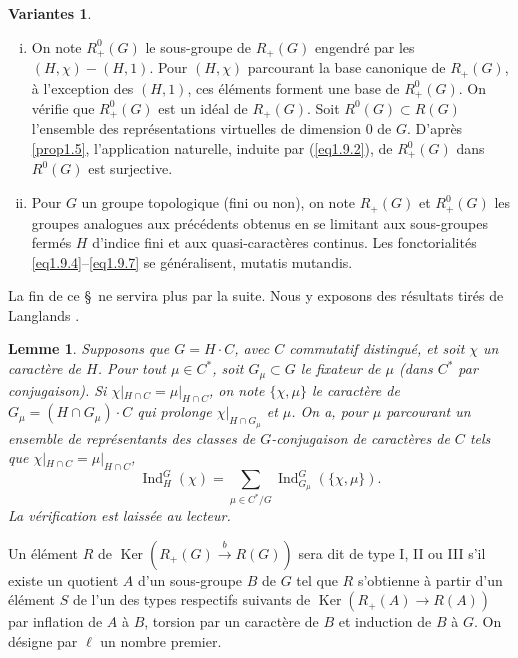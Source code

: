 \documentclass[11pt,a4paper]{amsart}
\theoremstyle{plain}
\newtheorem{lemma}[theorem]{Lemme}
\theoremstyle{definition}
\newtheorem{variants}[theorem]{Variantes}
\DeclareMathOperator{\Ind}{Ind}
\DeclareMathOperator{\Ker}{Ker}
\newenvironment{para}{\par\noindent}{\par}
\begin{document}
\begin{variants}
\ \begin{enumerate}[(i)]
\item On note $R_{+}^{0}(G)$ le sous-groupe de $R_{+}(G)$ engendr\'e par les $(H,\chi) - (H,1)$. Pour $(H,\chi)$ parcourant la base canonique de $R_{+}(G)$, \`a l'exception des $(H,1)$, ces \'el\'ements forment une base de $R_{+}^{0}(G)$. On v\'erifie que $R_{+}^{0}(G)$ est un id\'eal de $R_{+}(G)$. Soit $R^{0}(G) \subset R(G)$ l'ensemble des repr\'esentations virtuelles de dimension $0$ de $G$. D'apr\`es \ref{prop1.5}, l'application naturelle, induite par (\ref{eq1.9.2}), de $R_{+}^{0}(G)$ dans $R^{0}(G)$ est surjective.
\item Pour $G$ un groupe topologique (fini ou non), on note $R_{+}(G)$ et $R_{+}^{0}(G)$ les groupes analogues aux pr\'ec\'edents obtenus en se limitant aux sous-groupes ferm\'es $H$ d'indice fini et aux quasi-caract\`eres continus. Les fonctorialit\'es \ref{eq1.9.4}--\ref{eq1.9.7} se g\'en\'eralisent, mutatis mutandis.
\end{enumerate}
\end{variants}

\begin{para}
La fin de ce \S\ ne servira plus par la suite. Nous y exposons des r\'esultats tir\'es de Langlands \cite{9}.
\end{para}

\begin{lemma}\label{lem1.11}
Supposons que $G = H \cdot C$, avec $C$ commutatif distingu\'e, et soit $\chi$ un caract\`ere de $H$. Pour tout $\mu \in C^{*}$, soit $G_{\mu} \subset G$ le fixateur de $\mu$ (dans $C^{*}$ par conjugaison). Si $\chi|_{H \cap C} = \mu|_{H \cap C}$, on note $\{\chi,\mu\}$ le caract\`ere de $G_{\mu} = (H \cap G_{\mu}) \cdot C$ qui prolonge $\chi|_{H \cap G_{\mu}}$ et $\mu$. On a, pour $\mu$ parcourant un ensemble de repr\'esentants des classes de $G$-conjugaison de caract\`eres de $C$ tels que $\chi|_{H \cap C} = \mu|_{H \cap C}$,
\[
\Ind_{H}^{G}(\chi) = \sum_{\mu \in C^{*}/G} \Ind_{G_{\mu}}^{G}(\{\chi,\mu\}).
\]
La v\'erification est laiss\'ee au lecteur.
\end{lemma}

\begin{para}
Un \'el\'ement $R$ de $\Ker(R_{+}(G) \xrightarrow{b} R(G))$ sera dit de type I, II ou III s'il existe un quotient $A$ d'un sous-groupe $B$ de $G$ tel que $R$ s'obtienne \`a partir d'un \'el\'ement $S$ de l'un des types respectifs suivants de $\Ker(R_{+}(A) \to R(A))$ par inflation de $A$ \`a $B$, torsion par un caract\`ere de $B$ et induction de $B$ \`a $G$. On d\'esigne par $\ell$ un nombre premier.
\end{para}
\end{document}
